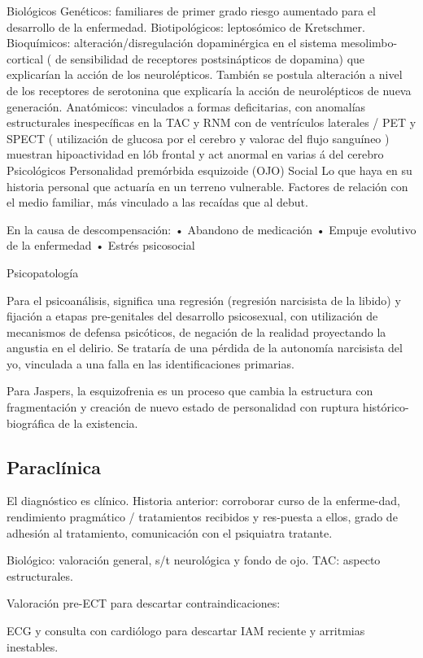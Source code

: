 Biológicos Genéticos: familiares de primer grado riesgo aumentado para el desarrollo de la enfermedad. Biotipológicos: leptosómico de Kretschmer. Bioquímicos: alteración/disregulación dopaminérgica en el sistema mesolimbo-cortical ( de sensibilidad de receptores postsinápticos de dopamina) que explicarían la acción de los neurolépticos. También se postula alteración a nivel de los receptores de serotonina que explicaría la acción de neurolépticos de nueva generación. Anatómicos: vinculados a formas deficitarias, con anomalías estructurales inespecíficas en la TAC y RNM con de ventrículos laterales / PET y SPECT ( utilización de glucosa por el cerebro y valorac del flujo sanguíneo ) muestran hipoactividad en lób frontal y act anormal en varias á del cerebro Psicológicos Personalidad premórbida esquizoide (OJO) Social Lo que haya en su historia personal que actuaría en un terreno vulnerable. Factores de relación con el medio familiar, más vinculado a las recaídas que al debut.

En la causa de descompensación: • Abandono de medicación • Empuje evolutivo de la enfermedad • Estrés psicosocial

Psicopatología

Para el psicoanálisis, significa una regresión (regresión narcisista de la libido) y fijación a etapas pre-genitales del desarrollo psicosexual, con utilización de mecanismos de defensa psicóticos, de negación de la realidad proyectando la angustia en el delirio. Se trataría de una pérdida de la autonomía narcisista del yo, vinculada a una falla en las identificaciones primarias.

Para Jaspers, la esquizofrenia es un proceso que cambia la estructura con fragmentación y creación de nuevo estado de personalidad con ruptura histórico-biográfica de la existencia.
\subsection*{Paraclínica}
El diagnóstico es clínico. Historia anterior: corroborar curso de la enferme-dad, rendimiento pragmático / tratamientos recibidos y res-puesta a ellos, grado de adhesión al tratamiento, comunicación con el psiquiatra tratante.

Biológico: valoración general, s/t neurológica y fondo de ojo. TAC: aspecto estructurales.

Valoración pre-ECT para descartar contraindicaciones:

ECG y consulta con cardiólogo para descartar IAM reciente y arritmias inestables.


